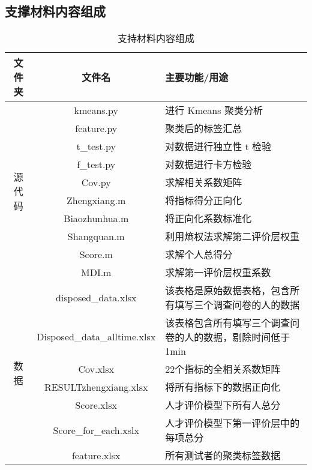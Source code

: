 \documentclass[withoutpreface,bwprint]{cumcmthesis} %
\begin{document}
\newpage
\begin{appendices}

\section{支撑材料内容组成}


\begin{table}[h!]
    \centering
    \begin{tabular}{c|c|m{10cm}}
        \hline
        \textbf{文件夹} & \textbf{文件名} & \textbf{主要功能/用途} \\
        \hline
        \multirow{10}{*}{源代码} 
        & kmeans.py & 进行 Kmeans 聚类分析 \\
        \cline{2-3}
        & feature.py & 聚类后的标签汇总 \\
        \cline{2-3}
        & t\_test.py & 对数据进行独立性 t 检验 \\
        \cline{2-3}
        & f\_test.py & 对数据进行卡方检验 \\
        \cline{2-3}
        & Cov.py & 求解相关系数矩阵 \\
        \cline{2-3}
        & Zhengxiang.m & 将指标得分正向化 \\
        \cline{2-3}
        & Biaozhunhua.m & 将正向化系数标准化 \\
        \cline{2-3}
        & Shangquan.m & 利用熵权法求解第二评价层权重 \\
        \cline{2-3}
        & Score.m & 求解个人总得分 \\
        \cline{2-3}
        & MDI.m & 求解第一评价层权重系数 \\
        \hline
        \multirow{7}{*}{数据} 
        & disposed\_data.xlsx & 该表格是原始数据表格，包含所有填写三个调查问卷的人的数据 \\
        \cline{2-3}
        & Disposed\_data\_alltime.xlsx & 该表格包含所有填写三个调查问卷的人的数据，剔除时间低于 1min \\
        \cline{2-3}
        & Cov.xlsx & 22个指标的全相关系数矩阵 \\
        \cline{2-3}
        & RESULTzhengxiang.xlsx & 将所有指标下的数据正向化 \\
        \cline{2-3}
        & Score.xlsx & 人才评价模型下所有人总分 \\
        \cline{2-3}
        & Score\_for\_each.xslx & 人才评价模型下第一评价层中的每项总分 \\
        \cline{2-3}
        & feature.xlsx   & 所有测试者的聚类标签数据 \\
        \hline
    \end{tabular}
    \caption{支持材料内容组成}
    \label{tab:supporting_materials}
\end{table}

\end{appendices}
\end{document}
